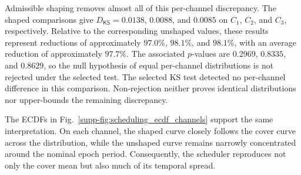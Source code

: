 \documentclass[journal]{IEEEtran}
\theoremstyle{definition}
\theoremstyle{game}
\begin{document}
Admissible shaping removes almost all of this per-channel discrepancy.
The shaped comparisons give
$D_{\mathsf{KS}}=0.0138$, $0.0088$, and $0.0085$ on $C_1$, $C_2$,
and $C_3$, respectively. Relative to the corresponding unshaped
values, these results represent reductions of approximately
$97.0\%$, $98.1\%$, and $98.1\%$, with an average reduction of
approximately $97.7\%$. The associated $p$-values are $0.2969$,
$0.8335$, and $0.8629$, so the null hypothesis of equal
per-channel distributions is not rejected under the selected test.
The selected KS test detected no per-channel difference in this
comparison. Non-rejection neither proves identical distributions nor
upper-bounds the remaining discrepancy.

The ECDFs in
Fig.~\ref{supp-fig:scheduling_ecdf_channels} support the same interpretation. On each channel, the shaped curve
closely follows the cover curve across the distribution, while the
unshaped curve remains narrowly concentrated around the nominal epoch
period. Consequently, the scheduler reproduces not only the cover
mean but also much of its temporal spread.
\end{document}
